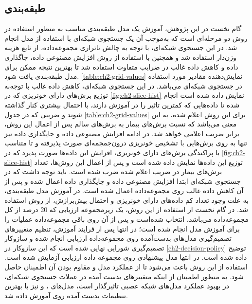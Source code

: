 \subsection{طبقه‌بندی}

گام نخست در این پژوهش، آموزش یک مدل طبقه‌بندی مناسب به منظور استفاده در روش دو مرحله‌ای است که به‌موجب آن یک جستجوی شبکه‌ای 
با استفاده از مدل 
انجام شد. در این جستجوی شبکه‌ای،‌ با توجه به چالش‌ ناترازی مجموعه‌داده، از تابع هزینه 
وزن‌دار استفاده شد و همچنین با استفاده از روش افزایش مصنوعی داده، جاگذاری داده
و کاهش داده غالب در ضرایب متفاوت استفاده شد تا بهترین نتیجه ممکن برای مدل طبقه‌بندی یافت شود. 
\autoref{table:ch2-grid-values}
نمایش‌دهنده مقادیر مورد استفاده در جستجوی شبکه‌ای می‌باشد. در این جستجوی شبکه‌ای، کاهش داده غالب با توجه‌به توزیع برش‌های دارای خونریزی که در 
\autoref{fig:ch2-slice-hist}
نمایش داده شده است انجام شده تا داده‌هایی که کمترین تاثیر را در آموزش دارند،‌ با احتمال بیشتری کنار گذاشته شوند و ضریبی که در جدول 
\autoref{table:ch2-grid-values}
برای این روش اعلام شده،‌ به این معنی می‌باشد که نسبت برش‌های بیمار به برش‌های سالم پس از اعمال این روش، برابر ضریب اعلامی خواهد شد.
در ادامه افزایش مصنوعی داده و جایگذاری داده نیز‌ تنها به روی برش‌هایی با تشخیص خونریزی درون‌جمجمه‌ای صورت پذیرفته و تا متناسب  با پراکندگی برش‌های دارای خونریزی، افزایش این داده‌ها صورت پذیرد که در 
\autoref{fig:ch2-slice-hist}
توزیع این داده‌ها نمایش داده شده است و پس از اعمال این روش‌ها، تعداد برش‌های بیمار در ضریب اعلام شده ضرب شده است. باید توجه داشت که در جستجوی شبکه‌ای ابتدا  افزایش مصنوعی داده و جایگذاری داده اعمال شده و پس از آن کاهش داده غالب روی مجموعه‌داده اعمال شده است.
در آموزش مدل طبقه‌بندی، به علت وجود تعداد کم داده‌های دارای خونریزی و احتمال بیش‌برازش،
از روش 
استفاده شد. در گام نخست از استفاده از این روش، یک زیرمجموعه ارزیابی
که 20 درصد از کل مجموعه‌داده می‌باشد، انتخاب شده‌است و پس از آن روی باقی مجموعه‌داده عملیات
را برای آموزش مدل انجام شده است؛ در انتها پس از فرایند آموزش، تنظیم متغییرهای تصمیم‌گیری‌ مدل‌های بدست‌آمده روی مجموعه‌داده ارزیابی انجام شده و سازوکار تصمیم‌گیری شورایی
نهایی شده است که این سازوکار در 
\autoref{ch2-decision-policy}
توضیح داده شده است.
در انتها مدل پیشنهادی روی مجموعه داده ارزیابی آزمایش شده است. استفاده از این روش باعث می‌شود تا از عملکرد مدل و مقاوم بودن آن اطمینان حاصل شود. به منظور اطمینان از اینکه متغییرهای بدست آمده در عملات جستجوی شبکه‌ای،‌ در بهبود عملکرد مدل‌های شبکه عصبی تاثیرگذار است، مدل‌های 
، و 
نیز با بهترین تنظیمات بدست آمده روی 
آموزش داده شد.

